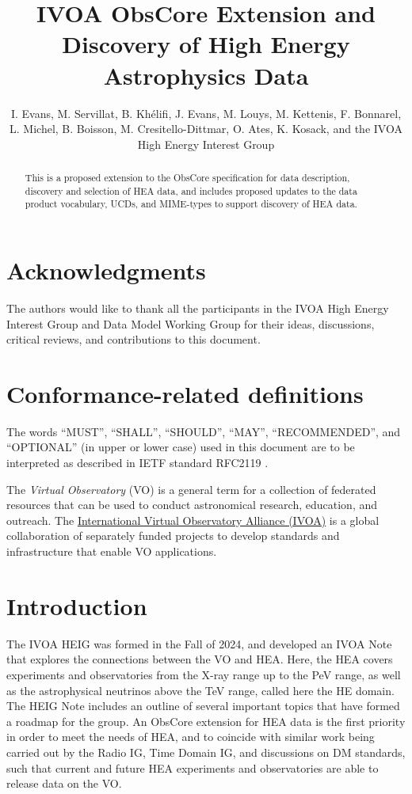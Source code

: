 \documentclass[11pt,a4paper]{ivoa}
\title{IVOA ObsCore Extension and Discovery of High Energy Astrophysics Data}
\author{I. Evans, M. Servillat, B. Khélifi, J. Evans, M. Louys, M. Kettenis, F. Bonnarel, L. Michel, B. Boisson, M. Cresitello-Dittmar, O. Ates, K. Kosack, and the IVOA High Energy Interest Group}
\begin{document}
\begin{abstract}
This is a proposed extension to the ObsCore specification for data description, discovery and selection of \gls{HEA} data, and includes proposed updates to the data product vocabulary, UCDs, and MIME-types to support discovery of \gls{HEA} data.
\end{abstract}


\section*{Acknowledgments}

The authors would like to thank all the participants in the IVOA High Energy Interest Group and Data Model Working Group for their ideas, discussions, critical reviews, and contributions to this document.


\section*{Conformance-related definitions}

The words ``MUST'', ``SHALL'', ``SHOULD'', ``MAY'', ``RECOMMENDED'', and ``OPTIONAL'' (in upper or lower case) used in this document are to be interpreted as described in IETF standard RFC2119 \citep{std:RFC2119}.

The \emph{Virtual Observatory} (VO) is a general term for a collection of federated resources that can be used to conduct astronomical research, education, and outreach.
The \href{https://www.ivoa.net}{International Virtual Observatory Alliance (IVOA)} is a global collaboration of separately funded projects to develop standards and infrastructure that enable VO applications.


\section{Introduction}

The \gls{IVOA} \gls{HEIG} was formed in the Fall of 2024, and developed an \gls{IVOA} Note \citep{2024ivoa.note.heig} that explores the connections between the \gls{VO} and \gls{HEA}. Here, the \gls{HEA} covers experiments and observatories from the X-ray range up to the PeV range, as well as the astrophysical neutrinos above the TeV range, called here the \gls{HE} domain. The HEIG Note includes an outline of several important topics that have formed a roadmap for the group. An ObsCore \citep{2017ivoa.spec.0509L} extension for \gls{HEA} data is the first priority in order to meet the needs of HEA, and to coincide with similar work being carried out by the Radio IG, Time Domain IG, and discussions on DM standards, such that current and future \gls{HEA} experiments and observatories are able to release data on the \gls{VO}.
\end{document}
